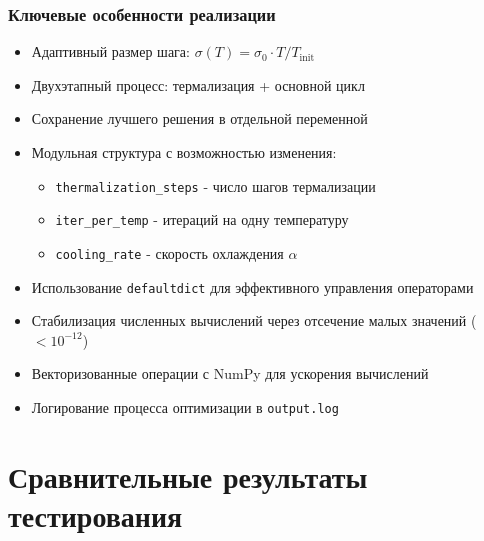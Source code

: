 \documentclass[a4paper]{report}
\begin{document}
\subsubsection{Ключевые особенности реализации}
\begin{itemize}
    \item Адаптивный размер шага: $\sigma(T) = \sigma_0 \cdot T/T_{\text{init}}$
    \item Двухэтапный процесс: термализация + основной цикл
    \item Сохранение лучшего решения в отдельной переменной
    \item Модульная структура с возможностью изменения:
      \begin{itemize}
      \item \texttt{thermalization\_steps} - число шагов термализации
      \item \texttt{iter\_per\_temp} - итераций на одну температуру
      \item \texttt{cooling\_rate} - скорость охлаждения $\alpha$
      \end{itemize}
    \item Использование \texttt{defaultdict} для эффективного управления операторами
    \item Стабилизация численных вычислений через отсечение малых значений ($<10^{-12}$)
    \item Векторизованные операции с NumPy для ускорения вычислений
    \item Логирование процесса оптимизации в \texttt{output.log}
\end{itemize}


\section{Сравнительные результаты тестирования}
\end{document}
